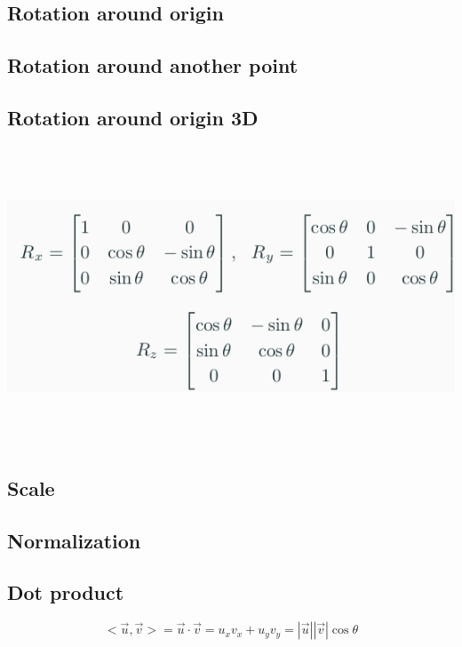 \subsection{Rotation around origin}

\subsection{Rotation around another point}

\subsection{Rotation around origin 3D}

\begin{center}
\includegraphics[width = 7in, height = 3.5in]{geometry/images/rotation3d.png}
\end{center}

\subsection{Scale}

\subsection{Normalization}

\subsection{Dot product}
\[
    <\vec{u}, \vec{v}> = \vec{u} \cdot \vec{v} = u_xv_x + u_yv_y = |\vec{u}||\vec{v}|\cos \theta
\]

